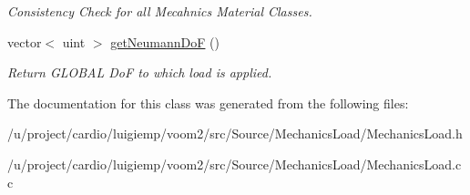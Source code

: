 \begin{DoxyCompactItemize}
\begin{DoxyCompactList}\small\item\em Consistency Check for all Mecahnics Material Classes. \item\end{DoxyCompactList}\item 
\hypertarget{classvoom_1_1_mechanics_load_ac6171ce7c8c616e8caef1906a102e656}{
vector$<$ uint $>$ \hyperlink{classvoom_1_1_mechanics_load_ac6171ce7c8c616e8caef1906a102e656}{getNeumannDoF} ()}
\label{classvoom_1_1_mechanics_load_ac6171ce7c8c616e8caef1906a102e656}

\begin{DoxyCompactList}\small\item\em Return GLOBAL DoF to which load is applied. \item\end{DoxyCompactList}\end{DoxyCompactItemize}


The documentation for this class was generated from the following files:\begin{DoxyCompactItemize}
\item 
/u/project/cardio/luigiemp/voom2/src/Source/MechanicsLoad/MechanicsLoad.h\item 
/u/project/cardio/luigiemp/voom2/src/Source/MechanicsLoad/MechanicsLoad.cc\end{DoxyCompactItemize}
